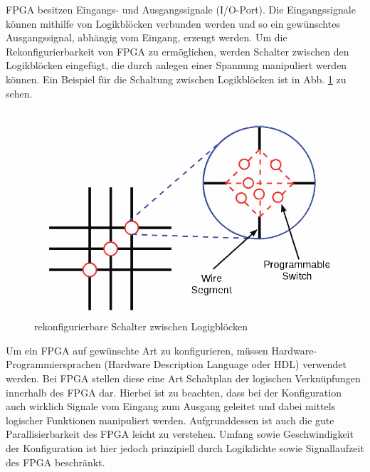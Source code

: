 FPGA besitzen Eingangs- und Ausgangssignale (I/O-Port).
Die Eingangssignale können mithilfe von Logikblöcken verbunden werden und so ein gewünschtes Ausgangssignal, abhängig vom Eingang, erzeugt werden.
Um die Rekonfigurierbarkeit von FPGA zu ermöglichen, werden \glqq Schalter\grqq{} zwischen den Logikblöcken eingefügt, die durch anlegen einer Spannung manipuliert werden können.
Ein Beispiel für die Schaltung zwischen Logikblöcken ist in Abb. \ref{schalter} zu sehen.
\begin{figure}[h]
  \includegraphics[width=\linewidth]{../Daten/schalter.png}
  \caption{rekonfigurierbare Schalter zwischen Logigblöcken}
  \label{schalter}
\end{figure}
Um ein FPGA auf gewünschte Art zu konfigurieren, müssen Hardware-Programmiersprachen (\glqq Hardware Description Language\grqq{} oder HDL) verwendet werden.
Bei FPGA stellen diese eine Art \glqq Schaltplan\grqq{} der logischen Verknüpfungen innerhalb des FPGA dar.
Hierbei ist zu beachten, dass bei der Konfiguration auch wirklich Signale vom Eingang zum Ausgang geleitet und dabei mittels logischer Funktionen manipuliert werden.
Aufgrunddessen ist auch die gute Parallisierbarkeit des FPGA leicht zu verstehen.
Umfang sowie Geschwindigkeit der Konfiguration ist hier jedoch prinzipiell durch Logikdichte sowie Signallaufzeit des FPGA beschränkt.

